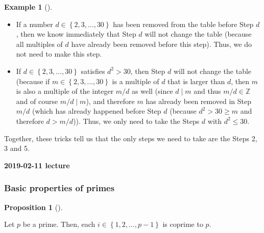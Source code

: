\documentclass[numbers=enddot,12pt,final,onecolumn,notitlepage]{scrartcl}%
\numberwithin{exer}{subsection}
\theoremstyle{definition}
\newtheorem{prop}[theo]{Proposition}
\newenvironment{proposition}[1][]
{\begin{prop}[#1]\begin{leftbar}}
{\end{leftbar}\end{prop}}
\newtheorem{exam}[theo]{Example}
\newenvironment{example}[1][]
{\begin{exam}[#1]\begin{leftbar}}
{\end{leftbar}\end{exam}}
\begin{document}
\begin{example}
\begin{itemize}
\item If a number $d\in\left\{  2,3,\ldots,30\right\}  $ has been removed from
the table before Step $d$, then we know immediately that Step $d$ will not
change the table (because all multiples of $d$ have already been removed
before this step). Thus, we do not need to make this step.

\item If $d\in\left\{  2,3,\ldots,30\right\}  $ satisfies $d^{2}>30$, then
Step $d$ will not change the table (because if $m\in\left\{  2,3,\ldots
,30\right\}  $ is a multiple of $d$ that is larger than $d$, then $m$ is also
a multiple of the integer $m/d$ as well (since $d\mid m$ and thus
$m/d\in\mathbb{Z}$ and of course $m/d\mid m$), and therefore $m$ has already
been removed in Step $m/d$ (which has already happened before Step $d$
(because $d^{2}>30\geq m$ and therefore $d>m/d$)). Thus, we only need to take
the Steps $d$ with $d^{2}\leq30$.
\end{itemize}

Together, these tricks tell us that the only steps we need to take are the
Steps 2, 3 and 5.
\end{example}

\begin{center}
\textbf{2019-02-11 lecture}
\end{center}

\subsubsection{Basic properties of primes}

\begin{proposition}
\label{prop.ent.prime.each-i-coprime}Let $p$ be a prime. Then, each
$i\in\left\{  1,2,\ldots,p-1\right\}  $ is coprime to $p$.
\end{proposition}
\end{document}
